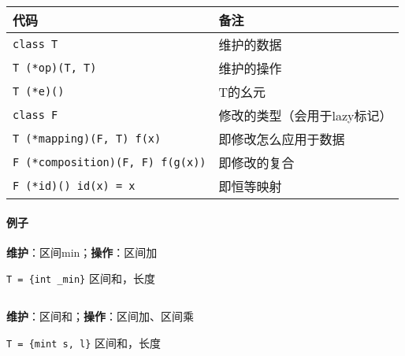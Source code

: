 \begin{tabular}{ll}
    \hline
    代码                                    & 备注               \\
    \hline
    \verb|class T|                        & 维护的数据            \\
    \verb|T (*op)(T, T)|                  & 维护的操作            \\
    \verb|T (*e)()|                       & T的幺元             \\
    \verb|class F|                        & 修改的类型（会用于lazy标记） \\
    \verb|T (*mapping)(F, T) f(x)|        & 即修改怎么应用于数据       \\
    \verb|F (*composition)(F, F) f(g(x))| & 即修改的复合           \\
    \verb|F (*id)() id(x) = x|            & 即恒等映射            \\
    \hline
\end{tabular}

\paragraph{例子}

\textbf{维护}：区间min；\textbf{操作}：区间加

\verb|T = {int _min}| 区间和，长度

\inputminted{cpp}{src/src/segtree_eg1.txt}

\textbf{维护}：区间和；\textbf{操作}：区间加、区间乘

\verb|T = {mint s, l}| 区间和，长度

\inputminted{cpp}{src/src/segtree_eg2.txt}
